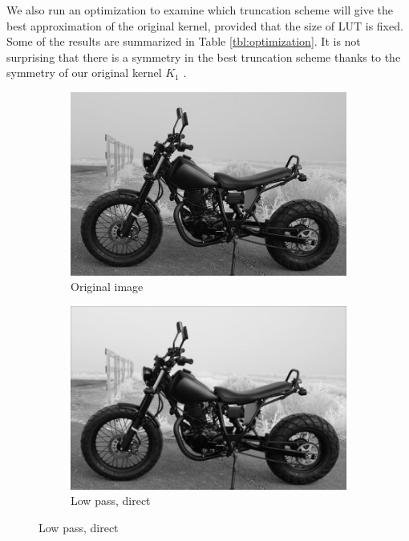 \documentclass[12pt]{amsart}
\theoremstyle{definition}
\theoremstyle{remark}
\numberwithin{thm}{section}
\begin{document}
We also run an optimization to examine which truncation scheme will give the best approximation of the original kernel, provided that the size of LUT is fixed. Some of the results are summarized in Table \ref{tbl:optimization}. It is not surprising that there is a symmetry in the best truncation scheme thanks to the symmetry of our original kernel $K_1$ . 

\begin{figure}[h] \centering 
\begin{subfigure}[b]{0.4\textwidth} \includegraphics[width=\textwidth]{motor_original.png} \caption{Original image} %
\end{subfigure}
\begin{subfigure}[b]{0.4\textwidth} \includegraphics[width=\textwidth]{motor_direct.png} \caption{Low pass, direct}\end{subfigure}


\end{figure}
\end{document}

